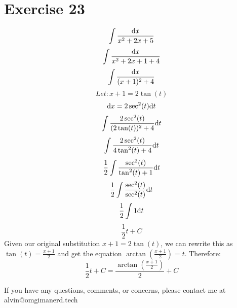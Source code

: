 \documentclass[letterpaper, 12pt]{math}
\begin{document}
\section*{Exercise 23}
\[ \int{\frac{\mathrm{d}{x}}{x^{2}+2x+5}} \]
\[ \int{\frac{\mathrm{d}{x}}{x^{2}+2x+1+4}} \]
\[ \int{\frac{\mathrm{d}{x}}{(x+1)^{2}+4}} \]
\[ Let: x+1 = 2\tan(t) \]
\[ \mathrm{d}{x} = 2\sec^{2}(t)\mathrm{d}{t} \]
\[ \int{\frac{2\sec^{2}(t)}{(2\tan(t))^{2}+4}\mathrm{d}{t}} \]
\[ \int{\frac{2\sec^{2}(t)}{4\tan^{2}(t)+4}\mathrm{d}{t}} \]
\[ \frac{1}{2}\int{\frac{\sec^{2}(t)}{\tan^{2}(t)+1}\mathrm{d}{t}} \]
\[ \frac{1}{2}\int{\frac{\sec^{2}(t)}{\sec^{2}(t)}\mathrm{d}{t}} \]
\[ \frac{1}{2}\int{1\mathrm{d}{t}} \]
\[ \frac{1}{2}t+C \]
Given our original substitution \( x+1 = 2\tan(t) \), we can rewrite this as
\( \tan(t) = \frac{x+1}{2} \) and get the equation
\( \arctan(\frac{x+1}{2}) = t \).
Therefore:
\[ \frac{1}{2}t+C = \frac{\arctan(\frac{x+1}{2})}{2}+C \]

\begin{center}
  If you have any questions, comments, or concerns, please contact me at
  alvin@omgimanerd.tech
\end{center}
\end{document}
